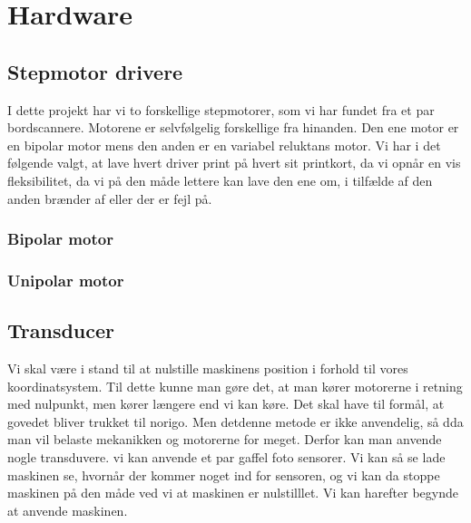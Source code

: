 \chapter{Hardware}


\section{Stepmotor drivere}
I dette projekt har vi to forskellige stepmotorer, som vi har fundet
fra et par bordscannere. Motorene er selvfølgelig forskellige fra
hinanden. Den ene motor er en bipolar motor mens den anden er en
variabel reluktans motor. Vi har i det følgende valgt, at lave hvert
driver print på hvert sit printkort, da vi opnår en vis fleksibilitet,
da vi på den måde lettere kan lave den ene om, i tilfælde af den anden
brænder af eller der er fejl på. 

\subsection{Bipolar motor}

\subsection{Unipolar motor}

 

\section{Transducer}
Vi skal være i stand til at nulstille maskinens position i forhold til
vores koordinatsystem. Til dette kunne man gøre det, at man kører
motorerne i retning med nulpunkt, men kører længere end vi kan
køre. Det skal have til formål, at govedet bliver trukket til norigo. Men
detdenne metode er ikke anvendelig, så dda man vil belaste mekanikken
og motorerne for meget. Derfor kan man anvende nogle transduvere. vi
kan anvende et par gaffel foto sensorer. Vi kan så se lade maskinen
se, hvornår der kommer noget ind for sensoren, og vi kan da stoppe
maskinen på den måde ved vi at maskinen er nulstilllet. Vi kan
harefter begynde at anvende maskinen. 

